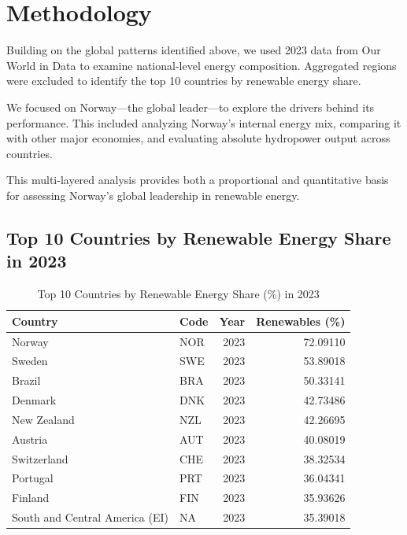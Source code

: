 \documentclass[
  letterpaper,
  DIV=11,
  numbers=noendperiod]{scrartcl}
\begin{document}
\newpage

\section{Methodology}\label{methodology}

Building on the global patterns identified above, we used 2023 data from
Our World in Data to examine national-level energy composition.
Aggregated regions were excluded to identify the top 10 countries by
renewable energy share.

We focused on Norway---the global leader---to explore the drivers behind
its performance. This included analyzing Norway's internal energy mix,
comparing it with other major economies, and evaluating absolute
hydropower output across countries.

This multi-layered analysis provides both a proportional and
quantitative basis for assessing Norway's global leadership in renewable
energy.

\subsection{Top 10 Countries by Renewable Energy Share in
2023}\label{top-10-countries-by-renewable-energy-share-in-2023}

\begin{longtable}[]{@{}llrr@{}}

\caption{\label{tbl-table-top10}Top 10 Countries by Renewable Energy
Share (\%) in 2023}

\tabularnewline

\toprule\noalign{}
Country & Code & Year & Renewables (\%) \\
\midrule\noalign{}
\endhead
\bottomrule\noalign{}
\endlastfoot
Norway & NOR & 2023 & 72.09110 \\
Sweden & SWE & 2023 & 53.89018 \\
Brazil & BRA & 2023 & 50.33141 \\
Denmark & DNK & 2023 & 42.73486 \\
New Zealand & NZL & 2023 & 42.26695 \\
Austria & AUT & 2023 & 40.08019 \\
Switzerland & CHE & 2023 & 38.32534 \\
Portugal & PRT & 2023 & 36.04341 \\
Finland & FIN & 2023 & 35.93626 \\
South and Central America (EI) & NA & 2023 & 35.39018 \\

\end{longtable}
\end{document}
